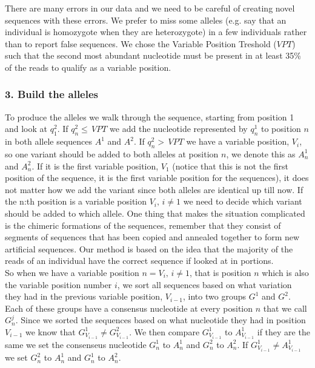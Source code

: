 There are many errors in our data and we need to be careful of creating novel sequences with these errors. We prefer to miss some alleles (e.g. say that an individual is homozygote when they are heterozygote) in a few individuals rather than to report false sequences. We chose the Variable Position Treshold ($VPT$) such that the second most abundant nucleotide must be present in at least 35\% of the reads to qualify as a variable position.\\

\subsubsection{3. Build the alleles}

To produce the alleles we walk through the sequence, starting from position 1 and look at $q_1^2$. If $q_n^2 \leq \, VPT$ we add the nucleotide represented by $q_n^1$ to position $n$ in both allele sequences $A^1$ and $A^2$. If $q_n^2 > \, VPT$ we have a variable position, $V_i$, so one variant should be added to both alleles at position $n$, we denote this as $A^1_n$ and $A^2_n$. If it is the first variable position, $V_1$ (notice that this is not the first position of the sequence, it is the first variable position for the sequences), it does not matter how we add the variant since both alleles are identical up till now. If the n:th position is a variable position $V_i, \, i \neq 1 $ we need to decide which variant should be added to which allele. One thing that makes the situation complicated is the chimeric formations of the sequences, remember that they consist of segments of sequences that has been copied and annealed together to form new artificial sequences. Our method is based on the idea that the majority of the reads of an individual have the correct sequence if looked at in portions.\\
So when we have a variable position $n = V_i, \, i \neq 1$, that is position $n$ which is also the variable position number $i$, we sort all sequences based on what variation they had in the previous variable position, $V_{i-1}$, into two groups $G^1$ and $G^2$. Each of these groups have a consensus nucleotide at every position $n$ that we call $G^j_n$. Since we sorted the sequences based on what nucleotide they had in position $V_{i-1}$ we know that $G^1_{V_{i-1}} \neq G^2_{V_{i-1}}$. We then compare $G^1_{V_{i-1}}$ to $A^1_{V_{i-1}}$ if they are the same we set the consenseus nucleotide $G^1_n$ to $A^1_n$ and $G^2_n$ to $A^2_n$. If $G^1_{V_{i-1}} \neq A^1_{V_{i-1}}$ we set $G^2_n$ to $A^1_n$ and $G^1_n$ to $A^2_n$.

